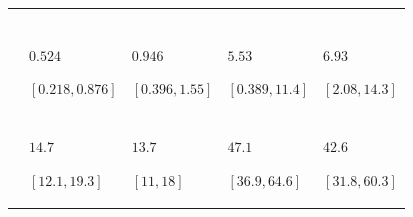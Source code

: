 \begin{table}
\centering
\begin{tabular}{>{\raggedleft\arraybackslash}m{1.2cm}>{\raggedright\arraybackslash}m{2.3cm}>{\raggedright\arraybackslash}m{2.3cm}>{\raggedright\arraybackslash}m{2.3cm}>{\raggedright\arraybackslash}m{2.3cm}}
\toprule
\multicolumn{1}{c}{\cellcolor{blue!15!gray}{}} & \multicolumn{2}{c}{\cellcolor{blue!15!gray}{All ages}} & \multicolumn{2}{c}{\cellcolor{blue!15!gray}{Adults only}} \\
\cellcolor{blue!15!gray}{Estimate} & \cellcolor{blue!15!gray}{Females} & \cellcolor{blue!15!gray}{Males} & \cellcolor{blue!15!gray}{Females} & \cellcolor{blue!15!gray}{Males}\\
\midrule
\addlinespace[0.3em]
\multicolumn{5}{l}{\cellcolor{blue!5!white!90!black}{\textbf{Variances}}}\\
\hspace{1em}\cellcolor{blue!5!white!90!black}{$V_{\text{Add}}$} & \cellcolor{gray}{$1.39$\par $[0.307,2.63]$} & \cellcolor{gray}{$2.62$\par $[0.911,4.53]$} & \cellcolor{gray}{$5.77$\par $[0.431,11.9]$} & \cellcolor{gray}{$7.75$\par $[2.37,15.5]$}\\
\hspace{1em}\cellcolor{blue!5!white!90!black}{$V_{\text{A}}$} & $0.524$\par $[0.218,0.876]$ & $0.946$\par $[0.396,1.55]$ & $5.53$\par $[0.389,11.4]$ & $6.93$\par $[2.08,14.3]$\\
\hspace{1em}\cellcolor{blue!5!white!90!black}{$V_{\text{AxAge}}$} & \cellcolor{gray}{$0.864$\par $[0.0928,1.77]$} & \cellcolor{gray}{$1.68$\par $[0.504,3.02]$} & \cellcolor{gray}{$0.252$\par $[0.0343,0.575]$} & \cellcolor{gray}{$0.761$\par $[0.212,1.26]$}\\
\hspace{1em}\cellcolor{blue!5!white!90!black}{$V_{\text{Tot}}$} & $14.7$\par $[12.1,19.3]$ & $13.7$\par $[11,18]$ & $47.1$\par $[36.9,64.6]$ & $42.6$\par $[31.8,60.3]$\\

\end{tabular}
\end{table}
